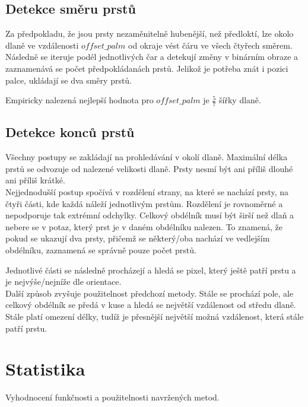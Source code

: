 \subsection{Detekce směru prstů}
Za předpokladu, že jsou prsty nezaměnitelně hubenější, než předloktí, lze okolo dlaně ve vzdálenosti $ offset\_palm $ od okraje vést čáru ve všech čtyřech směrem. Následně se iteruje podél jednotlivých čar a detekují změny v binárním obraze a zaznamenává se počet předpokládanách prstů. Jelikož je potřeba znát i pozici palce, ukládají se dva směry prstů.

Empiricky nalezená nejlepší hodnota pro $ offset\_palm $ je $ \frac{5}{7} $ šířky dlaně. 
\subsection{Detekce konců prstů}
Všechny postupy se zakládají na prohledávání v okolí dlaně. Maximální délka prstů se odvozuje od nalezené velikosti dlaně. Prsty nesmí být ani příliš dlouhé ani příliš krátké.\\

Nejjednodušší postup spočívá v rozdělení strany, na které se nachází prsty, na čtyři části, kde každá náleží jednotlivým prstům. Rozdělení je rovnoměrné a nepodporuje tak extrémní odchylky. Celkový obdélník musí být širší než dlaň a nebere se v potaz, který prst je v daném obdélníku nalezen. To znamená, že pokud se ukazují dva prsty, přičemž se některý/oba nachází ve vedlejším obdélníku, zaznamená se správně pouze počet prstů.

Jednotlivé části se následně procházejí a hledá se pixel, který ještě patří prstu a je nejvýše/nejníže dle orientace.\\

Další způsob zvyšuje použitelnost předchozí metody. Stále se prochází pole, ale celkový obdélník se předá v kuse a hledá se největší vzdálenost od středu dlaně. Stále platí omezení délky, tudíž je přesnější největší možná vzdálenost, která stále patří prstu.

\section{Statistika}
Vyhodnocení funkčnosti a použitelnosti navržených metod.

\endinput
